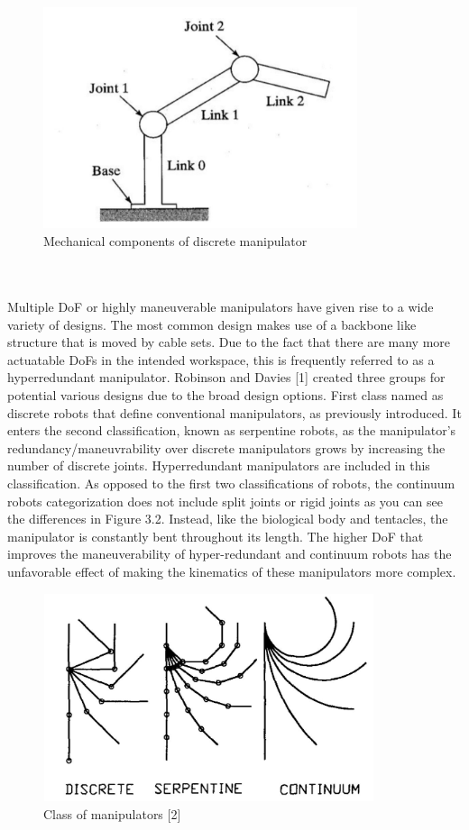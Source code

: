 \documentclass[12pt,twoside,a4]{mwbk}
\begin{document}
\begin{figure}[h]
    \centering
    \includegraphics[width=9.2cm, height=6.5cm]{discrete manipulator.JPG}
    \caption{Mechanical components of discrete manipulator}
\end{figure}
\\ \\
Multiple DoF or highly maneuverable manipulators have given rise to a wide variety of designs. The most common design makes use of a backbone like structure that is moved by cable sets. Due to the fact that there are many more actuatable DoFs in the intended workspace, this is frequently referred to as a hyperredundant manipulator. Robinson and Davies [1] created three groups for potential various designs due to the broad design options. First class named as discrete robots that define conventional manipulators, as previously introduced. It enters the second classification, known as serpentine robots, as the manipulator's redundancy/maneuvrability over discrete manipulators grows by increasing the number of discrete joints. Hyperredundant manipulators are included in this classification. As opposed to the first two classifications of robots, the continuum robots categorization does not include split joints or rigid joints as you can see the differences in Figure 3.2. Instead, like the biological body and tentacles, the manipulator is constantly bent throughout its length. The higher DoF that improves the maneuverability of hyper-redundant and continuum robots has the unfavorable effect of making the kinematics of these manipulators more complex.
\newpage
\begin{figure}[h!]
    \centering
    \includegraphics[width=9.7cm, height=6.1cm]{differences.JPG}
    \caption{Class of manipulators [2]}
\end{figure}
\end{document}
